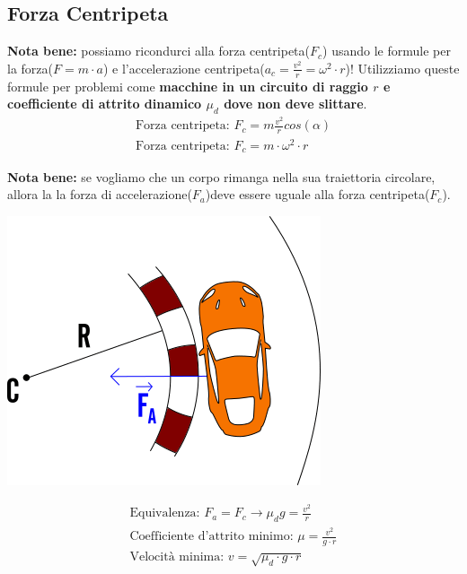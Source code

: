 \subsection{Forza Centripeta}
\textbf{Nota bene: } possiamo ricondurci alla forza centripeta($F_c$) usando le formule per la forza($F = m \cdot a$) e l'accelerazione centripeta($a_c = \frac{v^2}{r} = \omega^2 \cdot r $)! Utilizziamo queste formule per problemi come \textbf{macchine in un circuito di raggio $r$ e coefficiente di attrito dinamico $\mu_d$ dove non deve slittare}.
\\
\begin{gather*}
    \text{Forza centripeta: } F_c = m \frac{v^2}{r} cos (\alpha) \\
    \text{Forza centripeta: } F_c = m \cdot \omega^2 \cdot r
\end{gather*}

\textbf{Nota bene: } se vogliamo che un corpo rimanga nella sua traiettoria circolare, allora la la forza di accelerazione($F_a$)deve essere uguale alla forza centripeta($F_c$).

\begin{center}
\includegraphics[width=0.7 \linewidth]
{Dinamica/forza-centripeta.png}
\end{center}
\begin{gather*}
    \text{Equivalenza: } F_a = F_c \rightarrow \mu_d  g = \frac{v^2}{r} \\
    \text{Coefficiente d'attrito minimo: } \mu = \frac{v^2}{g \cdot r} \\
    \text{Velocità minima: } v = \sqrt{\mu_d \cdot g \cdot r}
\end{gather*}